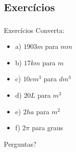 \documentclass[handout]{beamer}
\begin{document}
\subsection{Exercícios}
\begin{frame}\frametitle{\subsecname}
    \begin{block}{Exercícios}
        Converta:
        \begin{itemize}
            \item a) $1903m$ para $mm$
            \item b) $17km$ para $m$
            \item c) $10cm^3$ para $dm^3$
            \item d) $20L$ para $m^3$
            \item e) $2ha$ para $m^2$
            \item f) $2\pi$ para graus
        \end{itemize}
    \end{block}
\end{frame}


\begin{frame}
    \Huge{\centerline{Perguntas?}}
\end{frame}

\end{document}
